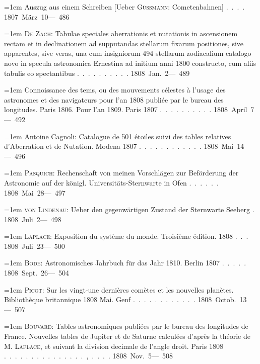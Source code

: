 \noindent\hangindent=1em Auszug aus einem Schreiben [Ueber \textsc{Güssmann}: Cometenbahnen] \mbox{.\ .\ .\ .} \hfill\mbox{1807 März 10}\quad\mbox{--- 486}\par\smallskip
\noindent\hangindent=1em \textsc{De Zach}: Tabulae speciales aberrationis et nutationis in ascensionem rectam et in declinationem ad supputandas stellarum fixarum positiones, sive apparentes, sive veras, una cum insigniorum 494 stellarum zodiacalium catalogo novo in specula astronomica Ernestina ad initium anni 1800 constructo, cum aliis tabulis eo spectantibus \mbox{.\ .\ .\ .\ .\ .\ .\ .\ .\ .} \hfill\mbox{1808 Jan. 2}\quad\mbox{--- 489}\par\smallskip
\noindent\hangindent=1em Connoissance des tems, ou des mouvements célestes à l'usage des astronomes et des navigateurs pour l'an 1808 publiée par le bureau des longitudes. Paris 1806. Pour l'an 1809. Paris 1807 \mbox{.\ .\ .\ .\ .\ .\ .\ .\ .\ .} \hfill\mbox{1808 April 7}\quad\mbox{--- 492}\par\smallskip
\noindent\hangindent=1em Antoine Cagnoli: Catalogue de 501 étoiles suivi des tables relatives d'Aberration et de Nutation. Modena 1807 \mbox{.\ .\ .\ .\ .\ .\ .\ .\ .\ .\ .\ .} \hfill\mbox{1808 Mai 14}\quad\mbox{--- 496}\par\smallskip
\noindent\hangindent=1em \textsc{Pasquich}: Rechenschaft von meinen Vorschlägen zur Beförderung der Astronomie auf der königl. Universitäts-Sternwarte in Ofen \mbox{.\ .\ .\ .\ .\ .} \hfill\mbox{1808 Mai 28}\quad\mbox{--- 497}\par\smallskip
\noindent\hangindent=1em \textsc{von} \textsc{Lindenau}: Ueber den gegenwärtigen Zustand der Sternwarte Seeberg \mbox{.} \hfill\mbox{1808 Juli 2}\quad\mbox{--- 498}\par\smallskip
\noindent\hangindent=1em \textsc{Laplace}: Exposition du système du monde. Troisième édition. 1808 \mbox{.\ .\ .} \hfill\mbox{1808 Juli 23}\quad\mbox{--- 500}\par\smallskip
\noindent\hangindent=1em \textsc{Bode}: Astronomisches Jahrbuch für das Jahr 1810. Berlin 1807 \mbox{.\ .\ .\ .\ .} \hfill\mbox{1808 Sept. 26}\quad\mbox{--- 504}\par\smallskip
\noindent\hangindent=1em \textsc{Picot}: Sur les vingt-une dernières comètes et les nouvelles planètes. Bibliothèque britannique 1808 Mai. Genf \mbox{.\ .\ .\ .\ .\ .\ .\ .\ .\ .\ .\ .} \hfill\mbox{1808 Octob. 13}\quad\mbox{--- 507}\par\smallskip
\noindent\hangindent=1em \textsc{Bouvard}: Tables astronomiques publiées par le bureau des longitudes de France. Nouvelles tables de Jupiter et de Saturne calculées d'après la théorie de M. \textsc{Laplace}, et suivant la division decimale de l'angle droit. Paris 1808 \mbox{.\ .\ .\ .\ .\ .\ .\ .\ .\ .\ .\ .\ .\ .\ .\ ,\ .\ .\ .\ .} \hfill\mbox{1808 Nov. 5}\quad\mbox{--- 508}\par\smallskip
